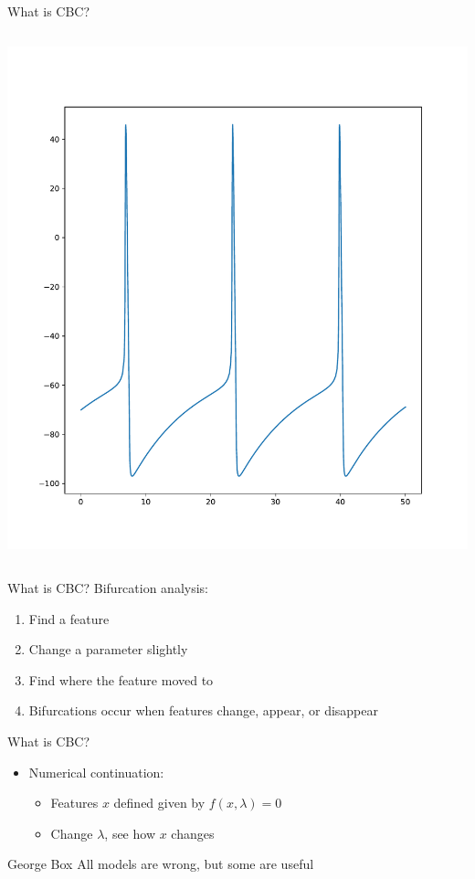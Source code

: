 \documentclass[presentation]{beamer}
\begin{document}
\begin{frame}[label={sec:orgec05972}]{What is CBC?}
\begin{columns}
\begin{column}{0.5\columnwidth}
\begin{center}
\includegraphics[height=.8\textheight]{./spiking.pdf}
\end{center}
\end{column}
\end{columns}
\end{frame}

\begin{frame}[label={sec:org49b8dfa}]{What is CBC?}
Bifurcation analysis:
\begin{enumerate}[<+->]
\item Find a feature
\item Change a parameter slightly
\item Find where the feature moved to
\item Bifurcations occur when features change, appear, or disappear
\end{enumerate}
\end{frame}

\begin{frame}[label={sec:orga8fcaab}]{What is CBC?}
\begin{itemize}
\item Numerical continuation:
\begin{itemize}
\item Features \(x\) defined given by \(f(x, \lambda)=0\)
\item Change \(\lambda\), see how \(x\) changes
\end{itemize}
\end{itemize}

\vfill

\begin{block}{George Box}
All models are wrong, but some are useful
\end{block}
\end{frame}
\end{document}

